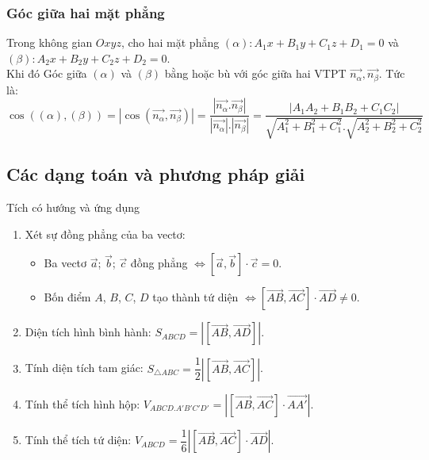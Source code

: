 \begin{tomtat}
\subsubsection{Góc giữa hai mặt phẳng}
Trong không gian $Oxyz$, cho hai mặt phẳng $\left(\alpha\right):A_1x+B_1y+C_1z+D_1=0$ và $\left(\beta\right):A_2x+B_2y+C_2z+D_2=0 $.\\
	Khi đó Góc giữa $\left(\alpha\right)$ và $\left(\beta\right)$ bằng hoặc bù với góc giữa hai VTPT $\overrightarrow{n_{\alpha}},\overrightarrow{n_{\beta}}$. Tức là:\\
	$$\boxed{ \cos\left(\left(\alpha\right),\left(\beta\right)\right)=\left|\cos\left(\overrightarrow{n_{\alpha}},\overrightarrow{n_\beta}\right)\right|=\dfrac{\left|\overrightarrow{n_{\alpha}}.\overrightarrow{n_{\beta}}\right|}{\left|\overrightarrow{n_{\alpha}}\right|.\left|\overrightarrow{n_{\beta}}\right|}=\dfrac{\left|A_1A_2+B_1B_2+C_1C_2\right|}{\sqrt{A_1^2+B_1^2+C_1^2}.\sqrt{A_2^2+B_2^2+C_2^2}}}$$
	
\end{tomtat}


\subsection{Các dạng toán và phương pháp giải}
\begin{dang}{Tích có hướng và ứng dụng}
	\begin{enumerate}
		\item Xét sự đồng phẳng của ba vectơ:
		\begin{itemize}
			\item Ba vectơ $\vec{a}$; $\vec{b}$; $\vec{c}$ đồng phẳng $\Leftrightarrow \left[ \vec{a},\vec{b} \right]\cdot \vec{c}=0$.
			\item Bốn điểm $A$, $B$, $C$, $D$ tạo thành tứ diện $\Leftrightarrow \left[ \vec{AB},\vec{AC} \right]\cdot \vec{AD}\ne 0$.
		\end{itemize}
		\item Diện tích hình bình hành: $S_{ABCD}=\left| \left[ \vec{AB},\vec{AD} \right] \right|$.
		\item Tính diện tích tam giác: $S_{\triangle ABC}=\dfrac{1}{2}\left| \left[ \vec{AB},\vec{AC} \right] \right|$.
		\item Tính thể tích hình hộp: $V_{ABCD.A'B'C'D'}=\left| \left[ \vec{AB},\vec{AC} \right]\cdot\vec{AA'} \right|$.
		\item Tính thể tích tứ diện: $V_{ABCD}=\dfrac{1}{6}\left| \left[ \vec{AB},\vec{AC} \right]\cdot \vec{AD} \right|$.
	\end{enumerate}
\end{dang}
